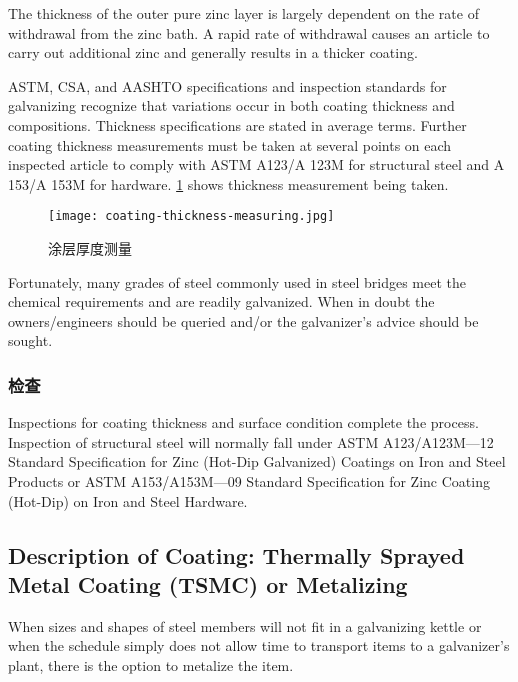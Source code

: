 The thickness of the outer pure zinc layer is largely dependent on the rate of withdrawal from the zinc bath. A
rapid rate of withdrawal causes an article to carry out additional zinc and generally results in a thicker coating.

ASTM, CSA, and AASHTO specifications and inspection standards for galvanizing recognize that variations occur in both coating thickness and compositions. Thickness specifications are stated in average terms. Further coating thickness measurements must be taken at several points on each inspected article to comply with ASTM A123/A 123M for structural steel and A 153/A 153M for hardware. \cref{fig:coating-thickness-measuring} shows thickness measurement being taken.

\begin{figure}
  \texttt{[image: coating-thickness-measuring.jpg]}
  \caption{涂层厚度测量}
  \label{fig:coating-thickness-measuring}
\end{figure}

Fortunately, many grades of steel commonly used in steel bridges meet the chemical requirements and are readily
galvanized. When in doubt the owners/engineers should be queried and/or the galvanizer’s advice should be sought.

\subsubsection{检查}

Inspections for coating thickness and surface condition complete the process. Inspection of structural steel will
normally fall under ASTM A123/A123M—12 Standard Specification for Zinc (Hot-Dip Galvanized) Coatings on
Iron and Steel Products or ASTM A153/A153M—09 Standard Specification for Zinc Coating (Hot-Dip) on Iron and
Steel Hardware.

\subsection{Description of Coating: Thermally Sprayed Metal Coating (TSMC) or Metalizing}
When sizes and shapes of steel members will not fit in a galvanizing kettle or when the schedule simply does not
allow time to transport items to a galvanizer’s plant, there is the option to metalize the item.

